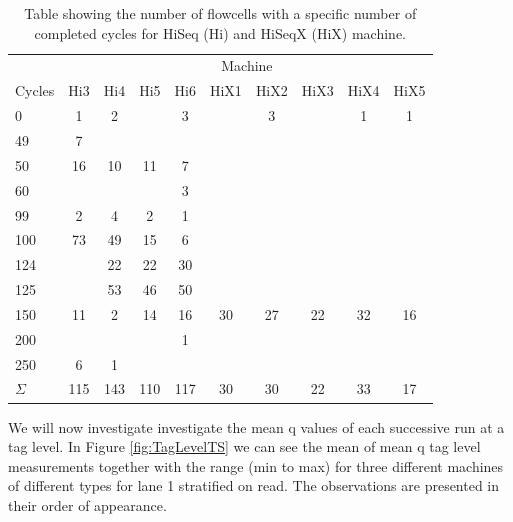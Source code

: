\documentclass[a4paper,11pt,fleqn,twoside,notitlepage]{report}\usepackage[]{graphicx}\usepackage[]{color}
\begin{document}
\begin{table}[!t]
\centering
\caption{Table showing the number of flowcells with a specific number of completed cycles for HiSeq (Hi) and HiSeqX (HiX) machine.} 
\begin{tabular}{lccccccccc}
  \toprule 
  & \multicolumn{9}{c}{Machine} \\ \cmidrule(r){2-10} 
Cycles & Hi3 & Hi4 & Hi5 & Hi6 & HiX1 & HiX2 & HiX3 & HiX4 & HiX5 \\ 
  \midrule
0 & 1 & 2 &  & 3 &  & 3 &  & 1 & 1 \\ 
49 & 7 &  &  &  &  &  &  &  &  \\ 
50 & 16 & 10 & 11 & 7 &  &  &  &  &  \\ 
60 &  &  &  & 3 &  &  &  &  &  \\ 
99 & 2 & 4 & 2 & 1 &  &  &  &  &  \\ 
100 & 73 & 49 & 15 & 6 &  &  &  &  &  \\ 
124 & & 22 & 22 & 30 &  &  &  &  &  \\ 
125 & & 53 & 46 & 50 &  &  &  &  &  \\ 
150 & 11 & 2 & 14 & 16 & 30 & 27 & 22 & 32 & 16 \\ 
200 & &  &  & 1 &  &  &  &  &  \\ 
250 & 6 & 1 &  &  &  &  &  &  &  \\ 
\midrule
$\Sigma$ & 115 & 143 & 110 & 117 & 30 & 30 & 22 & 33 & 17 \\ 
\bottomrule
\end{tabular}
\label{CompCycl}
\end{table}

We will now investigate investigate the mean q values of each successive run at a tag level. In Figure \ref{fig:TagLevelTS} we can see the mean of mean q tag level measurements together with the range (min to max) for three different machines of different types for lane 1 stratified on read. The observations are presented in their order of appearance.
\end{document}

